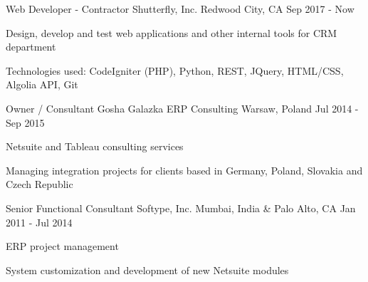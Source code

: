 
\begin{cventries}

	\cventry
		{Web Developer - Contractor}
		{Shutterfly, Inc.} %
		{Redwood City, CA} %
		{Sep 2017 - Now} %
		{
			\begin{cvitems} %
				\item {Design, develop and test web applications and other internal tools for CRM department}
				\item {Technologies used: CodeIgniter (PHP), Python, REST, JQuery, HTML/CSS, Algolia API, Git}
			\end{cvitems}
		}

	\cventry
		{Owner / Consultant}
		{Gosha Galazka ERP Consulting} %
		{Warsaw, Poland} %
		{Jul 2014 - Sep 2015} %
		{
			\begin{cvitems} %
				\item {Netsuite and Tableau consulting services}
				\item {Managing integration projects for clients based in Germany, Poland, Slovakia and Czech Republic}
			\end{cvitems}
		}


	\cventry
		{Senior Functional Consultant}
		{Softype, Inc.} %
		{Mumbai, India \& Palo Alto, CA} %
		{Jan 2011 - Jul 2014} %
		{
			\begin{cvitems} %
				\item {ERP project management}
				\item {System customization and development of new Netsuite modules}
			\end{cvitems}
		}

\end{cventries}
